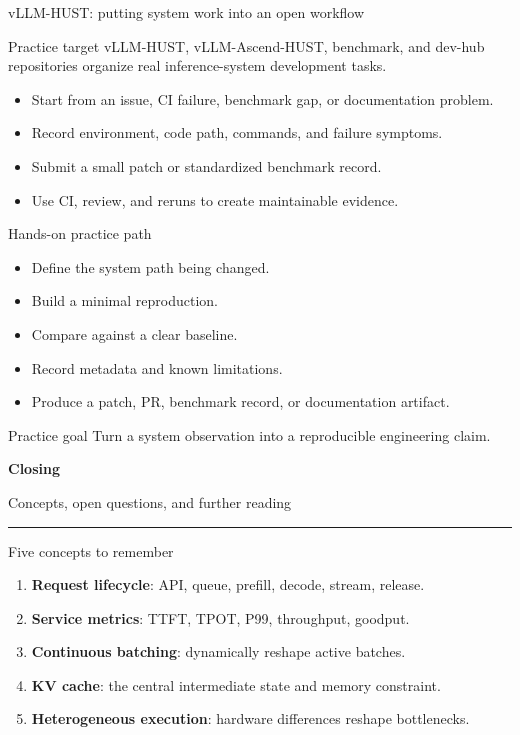 \documentclass[aspectratio=169,11pt]{beamer}
\newcommand{\term}[1]{\textcolor{HUSTBlue}{\textbf{#1}}}
\newcommand{\topicsectionpage}[2]{%
  \begin{frame}[plain]
    \vspace{1.0cm}
    {\huge\bfseries\textcolor{HUSTBlue}{#1}}\par
    \vspace{0.26cm}
    {\large\textcolor{HUSTGray}{#2}}\par
    \vfill
    \textcolor{HUSTLine}{\rule{0.76\paperwidth}{0.8pt}}
  \end{frame}
}
\begin{document}
\begin{frame}{vLLM-HUST: putting system work into an open workflow}
  \begin{block}{Practice target}
    vLLM-HUST, vLLM-Ascend-HUST, benchmark, and dev-hub repositories organize real inference-system development tasks.
  \end{block}
  \begin{itemize}
    \item Start from an issue, CI failure, benchmark gap, or documentation problem.
    \item Record environment, code path, commands, and failure symptoms.
    \item Submit a small patch or standardized benchmark record.
    \item Use CI, review, and reruns to create maintainable evidence.
  \end{itemize}
\end{frame}

\begin{frame}{Hands-on practice path}
  \begin{itemize}
    \item Define the system path being changed.
    \item Build a minimal reproduction.
    \item Compare against a clear baseline.
    \item Record metadata and known limitations.
    \item Produce a patch, PR, benchmark record, or documentation artifact.
  \end{itemize}
  \vspace{0.25cm}
  \begin{block}{Practice goal}
    Turn a system observation into a reproducible engineering claim.
  \end{block}
\end{frame}

\topicsectionpage{Closing}{Concepts, open questions, and further reading}

\begin{frame}{Five concepts to remember}
  \begin{enumerate}
    \item \term{Request lifecycle}: API, queue, prefill, decode, stream, release.
    \item \term{Service metrics}: TTFT, TPOT, P99, throughput, goodput.
    \item \term{Continuous batching}: dynamically reshape active batches.
    \item \term{KV cache}: the central intermediate state and memory constraint.
    \item \term{Heterogeneous execution}: hardware differences reshape bottlenecks.
  \end{enumerate}
\end{frame}
\end{document}
